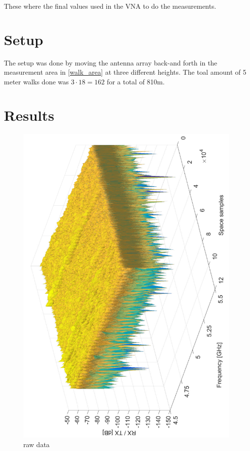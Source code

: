 These where the final values used in the VNA to do the measurements.

\section{Setup}
The setup was done by moving the antenna array back-and forth in the measurement area in \autoref{walk_area} at three different heights. The toal amount of 5 meter walks done was $3 \cdot 18 = 162$ for a total of 810m.
\section{Results}

\begin{figure}[H]
\centering
\includegraphics[height = \textwidth, angle = -90]{figures/rawFadingMeas.pdf}
\caption{raw data}
\label{fig:rawFadingMeas}
\end{figure}



